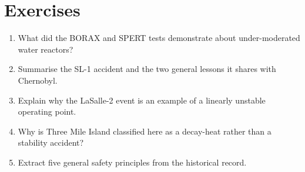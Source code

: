\section*{Exercises}
\begin{enumerate}[leftmargin=*,itemsep=2pt]
\item What did the BORAX and SPERT tests demonstrate about under-moderated water reactors?
\item Summarise the SL-1 accident and the two general lessons it shares with Chernobyl.
\item Explain why the LaSalle-2 event is an example of a linearly unstable operating point.
\item Why is Three Mile Island classified here as a decay-heat rather than a stability accident?
\item Extract five general safety principles from the historical record.
\end{enumerate}
